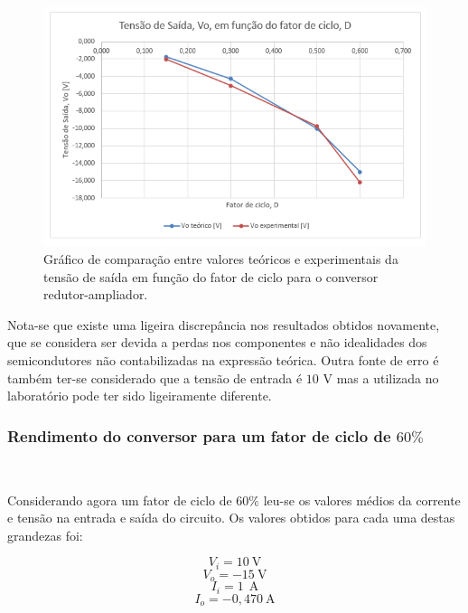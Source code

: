 \documentclass[a4paper,11pt]{article}
\numberwithin{equation}{section}
\begin{document}
\begin{figure}[H]
	\centering
	\includegraphics[keepaspectratio=true, scale=0.8]{teoricas/graf_buck_boost}
	\caption{Gráfico de comparação entre valores teóricos e experimentais da tensão de saída em função do fator de ciclo para o conversor redutor-ampliador.}
	\label{fig:graf_buck_boost}
	\vspace{-0.8em}
\end{figure}

Nota-se que existe uma ligeira discrepância nos resultados obtidos novamente, que se considera ser devida a perdas nos componentes e não idealidades dos semicondutores não contabilizadas na expressão teórica. Outra fonte de erro é também ter-se considerado que a tensão de entrada é $10$ V mas a utilizada no laboratório pode ter sido ligeiramente diferente.

\subsubsection{Rendimento do conversor para um fator de ciclo de $60\%$}\mbox{}\

Considerando agora um fator de ciclo de $60\%$ leu-se os valores médios da corrente e tensão na entrada e saída do circuito. Os valores obtidos para cada uma destas grandezas foi:

\begin{equation}
V_i = 10 ~ \text{V}
\end{equation} 
\vspace{-0,8 cm}
\begin{equation}
V_o = -15 ~ \text{V}
\end{equation} 
\vspace{-0,8 cm}
\begin{equation}
I_i = 1 ~  ~ \text{A}
\end{equation} 
\vspace{-0,8 cm}
\begin{equation}
I_o =-0,470  ~ \text{A}
\end{equation} 
\end{document}
